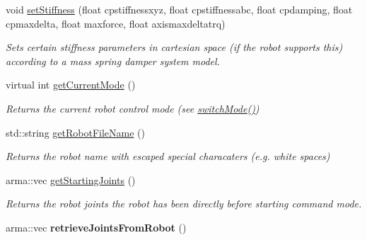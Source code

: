 \begin{DoxyCompactItemize}
\item 
void \hyperlink{classkukadu_1_1PlottingControlQueue_a676d19be17f169e3e411fd8f673b5d3d}{set\+Stiffness} (float cpstiffnessxyz, float cpstiffnessabc, float cpdamping, float cpmaxdelta, float maxforce, float axismaxdeltatrq)
\begin{DoxyCompactList}\small\item\em Sets certain stiffness parameters in cartesian space (if the robot supports this) according to a mass spring damper system model. \end{DoxyCompactList}\item 
virtual int \hyperlink{classkukadu_1_1PlottingControlQueue_a1cac1433bdc6072e4de8be13b113a6c4}{get\+Current\+Mode} ()
\begin{DoxyCompactList}\small\item\em Returns the current robot control mode (see \hyperlink{classkukadu_1_1PlottingControlQueue_ace69c9adaff27b5d98a42e70f7bc64ff}{switch\+Mode()}) \end{DoxyCompactList}\item 
std\+::string \hyperlink{classkukadu_1_1PlottingControlQueue_a1369090faea626819b1c43acf3ce08d1}{get\+Robot\+File\+Name} ()
\begin{DoxyCompactList}\small\item\em Returns the robot name with escaped special characaters (e.\+g. white spaces) \end{DoxyCompactList}\item 
arma\+::vec \hyperlink{classkukadu_1_1PlottingControlQueue_aa45636924606a9f4cf09ff2b65108bad}{get\+Starting\+Joints} ()
\begin{DoxyCompactList}\small\item\em Returns the robot joints the robot has been directly before starting command mode. \end{DoxyCompactList}\item 
arma\+::vec {\bfseries retrieve\+Joints\+From\+Robot} ()\hypertarget{classkukadu_1_1PlottingControlQueue_aff296baa49abc7d92bb20736823824d5}{}\label{classkukadu_1_1PlottingControlQueue_aff296baa49abc7d92bb20736823824d5}


\end{DoxyCompactItemize}
